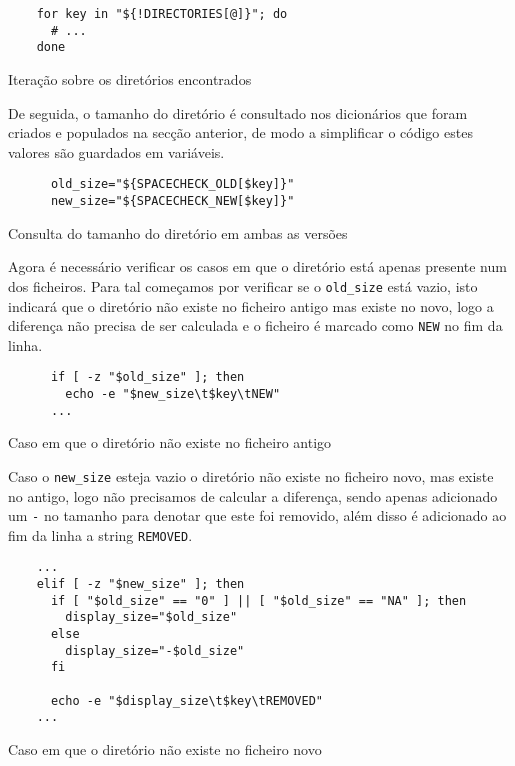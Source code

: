 \begin{listing}[H]
	\centering
	\begin{verbatim}
    for key in "${!DIRECTORIES[@]}"; do
      # ...
    done
  \end{verbatim}
	\caption{Iteração sobre os diretórios encontrados}
	\label{code:implementation_dirs_loop}
\end{listing}

De seguida, o tamanho do diretório é consultado nos dicionários que foram criados
e populados na secção anterior, de modo a simplificar o código estes valores são
guardados em variáveis.

\begin{listing}[H]
	\centering
	\begin{verbatim}
      old_size="${SPACECHECK_OLD[$key]}"
      new_size="${SPACECHECK_NEW[$key]}"
  \end{verbatim}
	\caption{Consulta do tamanho do diretório em ambas as versões}
\end{listing}

Agora é necessário verificar os casos em que o diretório está apenas presente
num dos ficheiros. Para tal começamos por verificar se o \Verb|old_size| está
vazio, isto indicará que o diretório não existe no ficheiro antigo mas existe
no novo, logo a diferença não precisa de ser calculada e o ficheiro é marcado
como \Verb|NEW| no fim da linha.

\begin{listing}[H]
	\centering
	\begin{verbatim}
      if [ -z "$old_size" ]; then
        echo -e "$new_size\t$key\tNEW"
      ...
  \end{verbatim}
	\caption{Caso em que o diretório não existe no ficheiro antigo}
\end{listing}

Caso o \Verb|new_size| esteja vazio o diretório não existe no ficheiro novo,
mas existe no antigo, logo não precisamos de calcular a diferença, sendo apenas
adicionado um \Verb|-| no tamanho para denotar que este foi removido, além disso
é adicionado ao fim da linha a string \Verb|REMOVED|.

\begin{listing}[H]
	\centering
	\begin{verbatim}
    ...
    elif [ -z "$new_size" ]; then
      if [ "$old_size" == "0" ] || [ "$old_size" == "NA" ]; then
        display_size="$old_size"
      else
        display_size="-$old_size"
      fi

      echo -e "$display_size\t$key\tREMOVED"
    ...
  \end{verbatim}
	\caption{Caso em que o diretório não existe no ficheiro novo}
	\label{code:implementation_new_size_empty}
\end{listing}

